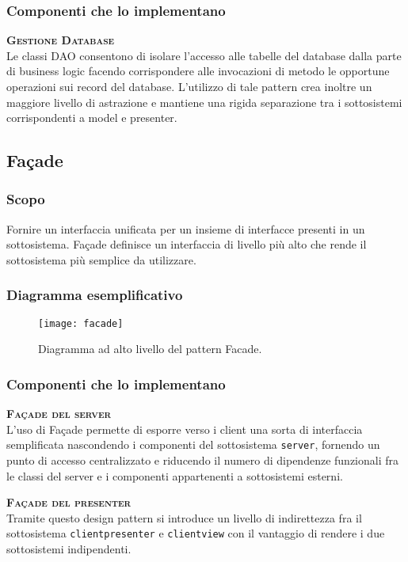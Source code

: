 \subsubsection{Componenti che lo implementano}
\begin{description}
\item{\scshape\bfseries Gestione Database}\\
Le classi DAO consentono di isolare l'accesso alle tabelle del database dalla parte di business logic facendo corrispondere alle invocazioni di metodo le opportune operazioni sui record del database. L'utilizzo di tale pattern crea inoltre un maggiore livello di astrazione e mantiene una rigida separazione tra i sottosistemi corrispondenti a model e presenter.
\end{description}

\subsection{Façade}
\subsubsection{Scopo}
Fornire un interfaccia unificata per un insieme di interfacce presenti in un sottosistema. Façade definisce un interfaccia di livello più alto che rende il sottosistema più semplice da utilizzare.

\subsubsection{Diagramma esemplificativo}
\begin{figure}[h]
\centering
\texttt{[image: facade]}
\caption{Diagramma ad alto livello del pattern Facade.}\label{fig:facade}
\end{figure}

\subsubsection{Componenti che lo implementano}
\begin{description}
  \item{\scshape \bfseries Façade del server}\\
  L'uso di Façade permette di esporre verso i client una sorta di interfaccia semplificata nascondendo i componenti del sottosistema \texttt{server}, fornendo un punto di accesso centralizzato e riducendo il numero di dipendenze funzionali fra le classi del server e i componenti appartenenti a sottosistemi esterni.
  \item{\scshape \bfseries Façade del presenter}\\
Tramite questo design pattern si introduce un livello di indirettezza fra il sottosistema \texttt{clientpresenter} e \texttt{clientview} con il vantaggio di rendere i due sottosistemi indipendenti.
\end{description}

